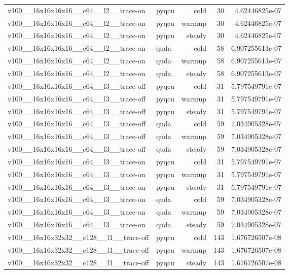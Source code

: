 \begin{table}[htbp]
\begin{tabular}{@{}llrrr@{}}
v100\_\_16x16x16x16\_\_c64\_\_l2\_\_trace-on & pyqcu & cold & 30 & 4.62446825e-07 \\
v100\_\_16x16x16x16\_\_c64\_\_l2\_\_trace-on & pyqcu & warmup & 30 & 4.62446825e-07 \\
v100\_\_16x16x16x16\_\_c64\_\_l2\_\_trace-on & pyqcu & steady & 30 & 4.62446825e-07 \\
v100\_\_16x16x16x16\_\_c64\_\_l2\_\_trace-on & quda & cold & 58 & 6.907255613e-07 \\
v100\_\_16x16x16x16\_\_c64\_\_l2\_\_trace-on & quda & warmup & 58 & 6.907255613e-07 \\
v100\_\_16x16x16x16\_\_c64\_\_l2\_\_trace-on & quda & steady & 58 & 6.907255613e-07 \\
v100\_\_16x16x16x16\_\_c64\_\_l3\_\_trace-off & pyqcu & cold & 31 & 5.797549791e-07 \\
v100\_\_16x16x16x16\_\_c64\_\_l3\_\_trace-off & pyqcu & warmup & 31 & 5.797549791e-07 \\
v100\_\_16x16x16x16\_\_c64\_\_l3\_\_trace-off & pyqcu & steady & 31 & 5.797549791e-07 \\
v100\_\_16x16x16x16\_\_c64\_\_l3\_\_trace-off & quda & cold & 59 & 7.034905328e-07 \\
v100\_\_16x16x16x16\_\_c64\_\_l3\_\_trace-off & quda & warmup & 59 & 7.034905328e-07 \\
v100\_\_16x16x16x16\_\_c64\_\_l3\_\_trace-off & quda & steady & 59 & 7.034905328e-07 \\
v100\_\_16x16x16x16\_\_c64\_\_l3\_\_trace-on & pyqcu & cold & 31 & 5.797549791e-07 \\
v100\_\_16x16x16x16\_\_c64\_\_l3\_\_trace-on & pyqcu & warmup & 31 & 5.797549791e-07 \\
v100\_\_16x16x16x16\_\_c64\_\_l3\_\_trace-on & pyqcu & steady & 31 & 5.797549791e-07 \\
v100\_\_16x16x16x16\_\_c64\_\_l3\_\_trace-on & quda & cold & 59 & 7.034905328e-07 \\
v100\_\_16x16x16x16\_\_c64\_\_l3\_\_trace-on & quda & warmup & 59 & 7.034905328e-07 \\
v100\_\_16x16x16x16\_\_c64\_\_l3\_\_trace-on & quda & steady & 59 & 7.034905328e-07 \\
v100\_\_16x16x32x32\_\_c128\_\_l1\_\_trace-off & pyqcu & cold & 143 & 1.676726507e-08 \\
v100\_\_16x16x32x32\_\_c128\_\_l1\_\_trace-off & pyqcu & warmup & 143 & 1.676726507e-08 \\
v100\_\_16x16x32x32\_\_c128\_\_l1\_\_trace-off & pyqcu & steady & 143 & 1.676726507e-08 \\

\end{tabular}
\end{table}

